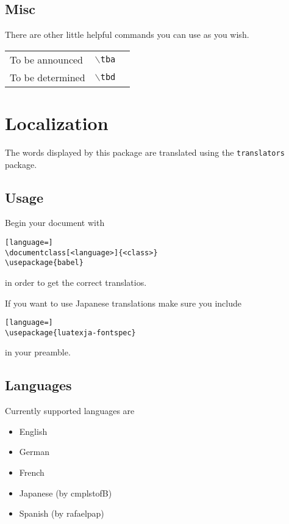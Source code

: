 \documentclass[english]{article}
\newcommand{\cmd}[1]{$\backslash$\texttt{{#1}}}
\begin{document}
	\subsection{Misc}
	\label{misc}
	There are other little helpful commands you can use as you wish.
	\begin{center}
		\begin{tabular}{lll}
			To be announced&\cmd{tba}&\tba\\
			To be determined&\cmd{tbd}&\tbd\\
		\end{tabular}
	\end{center}

	\pagebreak
	\section{Localization}
	The words displayed by this package are translated using the  \texttt{translators} package. 
	
	\subsection{Usage}
	Begin your document with
	\begin{lstlisting}[language=]
\documentclass[<language>]{<class>}
\usepackage{babel}
	\end{lstlisting}	
	in order to get the correct translatios.
	
	If you want to use Japanese translations make sure you include
	\begin{lstlisting}[language=]
\usepackage{luatexja-fontspec}
	\end{lstlisting}
	in your preamble.

	\subsection{Languages}
	Currently supported languages are
	\begin{itemize}
		\item 
		English
		
		\item
		German
		
		\item
		French
		
		\item
		Japanese (by cmplstofB)
		
		\item
		Spanish (by rafaelpap)
	\end{itemize}
\end{document}
